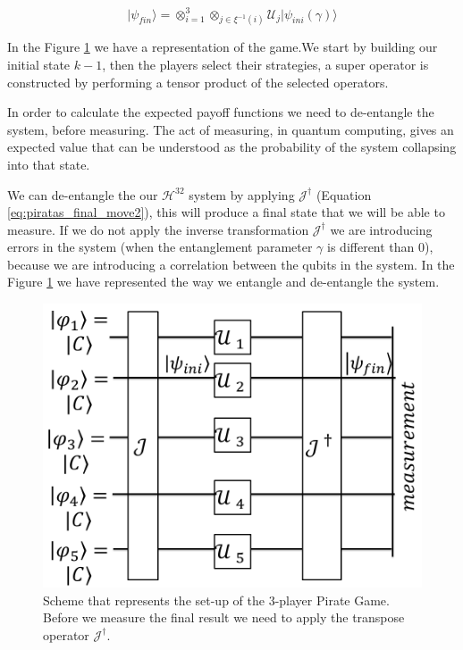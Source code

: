 \begin{equation}
\vert\psi_{fin}\rangle=\otimes_{i=1}^{3}\otimes_{j\in\xi^{-1}(i)}\mathcal{U}_{j}\vert\psi_{ini}(\gamma)\rangle
\label{eq:piratas_final_move}
\end{equation}

In the Figure \ref{fig:pg_architecture3players} we have a representation of the game.We start by building our initial state $k-1$, then the players  select their strategies, a super operator is constructed by performing a tensor product of the selected operators. 

In order to calculate the expected payoff functions we need to de-entangle the system, before measuring. The act of measuring, in quantum computing, gives an expected value that can be understood as the probability of the system collapsing into that state. 

We can de-entangle the our $\mathcal{H}^{32}$ system by applying $\mathcal{J}^{\dagger}$ (Equation \ref{eq:piratas_final_move2}), this will produce a final state that we will be able to measure. If we do not apply the inverse transformation $\mathcal{J}^{\dagger}$ we are introducing errors in the system (when the entanglement parameter $\gamma$ is different than $0$), because we are introducing a correlation between the qubits in the system. In the Figure \ref{fig:pg_architecture3players} we have represented the way we entangle and de-entangle the system.


\begin{figure}[h]
\centering 
\includegraphics[scale=0.35]{Figures/architecture/esquema/esquema.png}
\caption{Scheme that represents the set-up of the $3$-player Pirate Game. Before we measure the final result we need to apply the transpose operator $\mathcal{J}^{\dagger}$. }
\label{fig:pg_architecture3players}
\end{figure}



